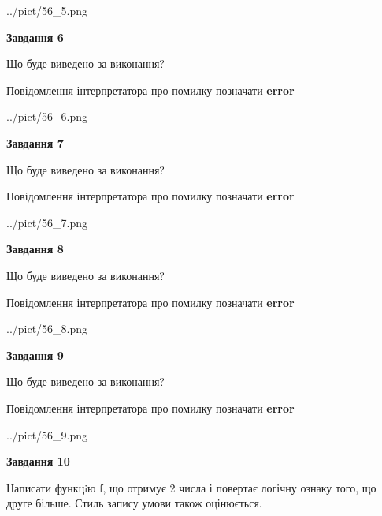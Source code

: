 \documentclass[12pt, ukrainian]{article}
\begin{document}
{\begin {large}
\begin{center}
	{../pict/56_5.png}
\end{center}
\newpage

{\begin {center}\textbf{Завдання 6}\end {center}}\par
Що буде виведено за виконання? \par
Повідомлення інтерпретатора про помилку позначати \textbf{error}

\begin{center}
	{../pict/56_6.png}
\end{center}
\newpage

{\begin {center}\textbf{Завдання 7}\end {center}}\par
Що буде виведено за виконання? \par
Повідомлення інтерпретатора про помилку позначати \textbf{error}

\begin{center}
	{../pict/56_7.png}
\end{center}
\newpage

{\begin {center}\textbf{Завдання 8}\end {center}}\par
Що буде виведено за виконання? \par
Повідомлення інтерпретатора про помилку позначати \textbf{error}

\begin{center}
	{../pict/56_8.png}
\end{center}
\newpage

{\begin {center}\textbf{Завдання 9}\end {center}}\par
Що буде виведено за виконання? \par
Повідомлення інтерпретатора про помилку позначати \textbf{error}

\begin{center}
	{../pict/56_9.png}
\end{center}
\newpage

{\begin {center}\textbf{Завдання 10}\end {center}}\par

Написати функцiю f, що отримує 2 числа і повертає логічну ознаку того, що друге більше. Стиль запису умови також оцінюється.\par
\newpage

\end {large}}
\end{document}
